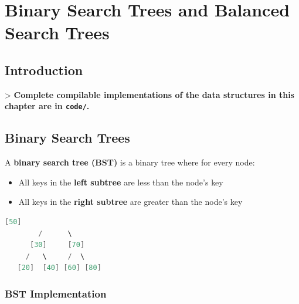 \chapter{Binary Search Trees and Balanced Search Trees}\label{ch11:binary-search-trees-and-balanced-search-trees}

\section{Introduction}

> \textbf{Complete compilable implementations of the data structures in this chapter are in \texttt{code/}.}

\section{Binary Search Trees}

A \textbf{binary search tree (BST)} is a binary tree where for every node:
\begin{itemize}
\item All keys in the \textbf{left subtree} are less than the node's key
\item All keys in the \textbf{right subtree} are greater than the node's key
\end{itemize}

\begin{lstlisting}[language=Java]
          [50]
        /      \
      [30]     [70]
     /   \     /  \
   [20]  [40] [60] [80]
\end{lstlisting}

\subsection{BST Implementation}

